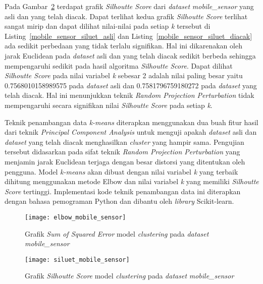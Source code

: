 Pada Gambar~\ref{fig:siluet_mobile_sensor} terdapat grafik \textit{Silhoutte Score} dari \textit{dataset} \textit{mobile\_sensor} yang asli dan yang telah diacak. Dapat terlihat kedua grafik \textit{Silhoutte Score} terlihat sangat mirip dan dapat dilihat nilai-nilai pada setiap \textit{k} tersebut di Listing~\ref{mobile_sensor_siluet_asli} dan Listing~\ref{mobile_sensor_siluet_diacak} ada sedikit perbedaan yang tidak terlalu signifikan. Hal ini dikarenakan oleh jarak Euclidean pada \textit{dataset} asli dan yang telah diacak sedikit berbeda sehingga mempengaruhi sedikit pada hasil algoritma \textit{Silhoutte Score}. Dapat dilihat \textit{Silhoutte Score} pada nilai variabel \textit{k} sebesar 2 adalah nilai paling besar yaitu 0.7568010158989575 pada \textit{dataset} asli dan 0.7581796759180272 pada \textit{dataset} yang telah diacak. Hal ini menunjukkan teknik \textit{Random Projection Perturbation} tidak mempengaruhi secara signifikan nilai \textit{Silhoutte Score} pada setiap \textit{k}.

Teknik penambangan data \textit{k-means} diterapkan menggunakan dua buah fitur hasil dari teknik \textit{Principal Component Analysis} untuk menguji apakah \textit{dataset} asli dan \textit{dataset} yang telah diacak menghasilkan \textit{cluster} yang hampir sama. Pengujian tersebut didasarkan pada sifat teknik \textit{Random Projection Perturbation} yang menjamin jarak Euclidean terjaga dengan besar distorsi yang ditentukan oleh pengguna. Model \textit{k-means} akan dibuat dengan nilai variabel \textit{k} yang terbaik dihitung menggunakan metode Elbow dan nilai variabel \textit{k} yang memiliki \textit{Silhoutte Score} tertinggi. Implementasi kode teknik penambangan data ini diterapkan dengan bahasa pemograman Python dan dibantu oleh \textit{library} Scikit-learn. 

\begin{figure}
	\centering
	\texttt{[image: elbow\_mobile\_sensor]}
	\caption{Grafik \textit{Sum of Squared Error} model \textit{clustering} pada \textit{dataset} \textit{mobile\_sensor}}
	\label{fig:elbow_mobile_sensor}
\end{figure}

\begin{figure}
	\centering
	\texttt{[image: siluet\_mobile\_sensor]}
	\caption{Grafik \textit{Silhoutte Score} model \textit{clustering} pada \textit{dataset} \textit{mobile\_sensor}}
	\label{fig:siluet_mobile_sensor}
\end{figure}
	
